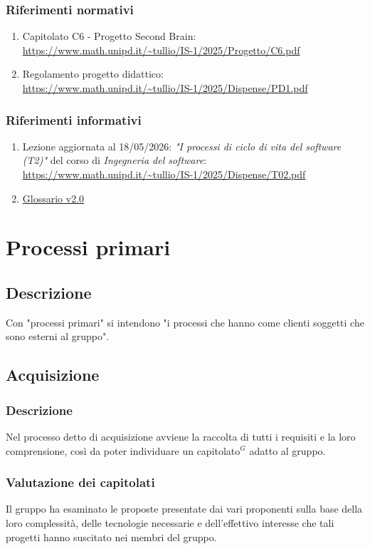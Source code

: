 \documentclass[a4paper,10pt]{article}
\begin{document}
\subsubsection{Riferimenti normativi}
\begin{enumerate}
  \item Capitolato C6 - Progetto Second Brain: \\ \url{https://www.math.unipd.it/~tullio/IS-1/2025/Progetto/C6.pdf}
  \item Regolamento progetto didattico: \\ \url{https://www.math.unipd.it/~tullio/IS-1/2025/Dispense/PD1.pdf}
\end{enumerate}
\subsubsection{Riferimenti informativi}
\begin{enumerate}
  \item Lezione aggiornata al 18/05/2026: \textit{"I processi di ciclo di vita del software (T2)"} del corso di \textit{Ingegneria del software}: \\ \url{https://www.math.unipd.it/~tullio/IS-1/2025/Dispense/T02.pdf} 
  \item \href{https://tool-8.github.io/Documentazione-SWE/glossario/Glossario.pdf}{Glossario v2.0}
\end{enumerate}

\section{Processi primari}
\subsection{Descrizione}
Con "processi primari" si intendono "i processi che hanno come clienti soggetti che sono esterni al gruppo".

\subsection{Acquisizione}
\subsubsection{Descrizione}
Nel processo detto di acquisizione avviene la raccolta di tutti i requisiti e la loro comprensione, così da poter 
individuare un capitolato$^G$ adatto al gruppo.
\subsubsection{Valutazione dei capitolati}
Il gruppo ha esaminato le proposte presentate dai vari proponenti sulla base della loro complessità,
delle tecnologie necessarie e dell’effettivo interesse che tali progetti hanno suscitato nei membri del gruppo.
\end{document}
